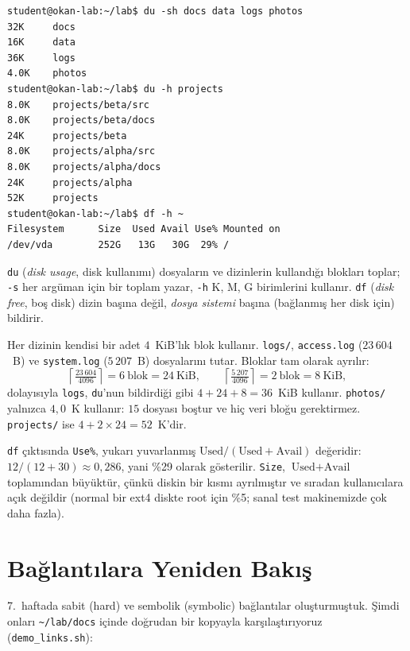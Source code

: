 \documentclass[11pt,a4paper]{article}
\newcommand{\cmd}[1]{\texttt{#1}}
\begin{document}
\begin{lstlisting}[style=term]
student@okan-lab:~/lab$ du -sh docs data logs photos
32K     docs
16K     data
36K     logs
4.0K    photos
student@okan-lab:~/lab$ du -h projects
8.0K    projects/beta/src
8.0K    projects/beta/docs
24K     projects/beta
8.0K    projects/alpha/src
8.0K    projects/alpha/docs
24K     projects/alpha
52K     projects
student@okan-lab:~/lab$ df -h ~
Filesystem      Size  Used Avail Use% Mounted on
/dev/vda        252G   13G   30G  29% /
\end{lstlisting}

\cmd{du} (\emph{disk usage}, disk kullanımı) dosyaların ve dizinlerin kullandığı blokları toplar; \cmd{-s} her argüman için bir toplam yazar, \cmd{-h} K, M, G birimlerini kullanır. \cmd{df} (\emph{disk free}, boş disk) dizin başına değil, \emph{dosya sistemi} başına (bağlanmış her disk için) bildirir.

\begin{example}
Her dizinin kendisi bir adet $4$~KiB'lık blok kullanır. \texttt{logs/}, \texttt{access.log} ($23\,604$~B) ve \texttt{system.log} ($5\,207$~B) dosyalarını tutar. Bloklar tam olarak ayrılır:
\[
\left\lceil \tfrac{23\,604}{4096} \right\rceil = 6 \ \text{blok} = 24\ \text{KiB}, \qquad
\left\lceil \tfrac{5\,207}{4096} \right\rceil = 2 \ \text{blok} = 8\ \text{KiB},
\]
dolayısıyla \texttt{logs}, \cmd{du}'nun bildirdiği gibi $4 + 24 + 8 = 36$~KiB kullanır. \texttt{photos/} yalnızca $4{,}0$~K kullanır: $15$ dosyası boştur ve hiç veri bloğu gerektirmez. \texttt{projects/} ise $4 + 2 \times 24 = 52$~K'dir.
\end{example}

\cmd{df} çıktısında \texttt{Use\%}, yukarı yuvarlanmış $\text{Used}/(\text{Used} + \text{Avail})$ değeridir: $12/(12+30) \approx 0{,}286$, yani \%29 olarak gösterilir. \texttt{Size}, $\text{Used} + \text{Avail}$ toplamından büyüktür, çünkü diskin bir kısmı ayrılmıştır ve sıradan kullanıcılara açık değildir (normal bir ext4 diskte root için \%5; sanal test makinemizde çok daha fazla).

\section{Bağlantılara Yeniden Bakış}
\label{sec:links}

7.~haftada sabit (hard) ve sembolik (symbolic) bağlantılar oluşturmuştuk. Şimdi onları \texttt{\textasciitilde/lab/docs} içinde doğrudan bir kopyayla karşılaştırıyoruz (\cmd{demo\_links.sh}):
\end{document}

